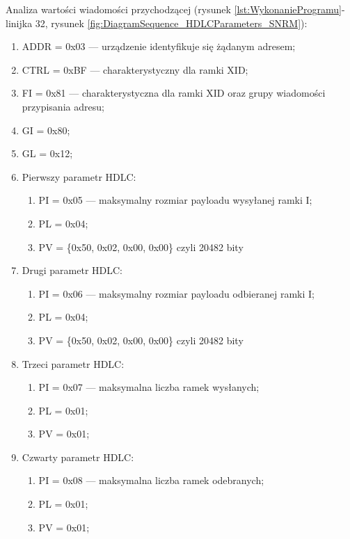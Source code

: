 Analiza wartości wiadomości przychodzącej 
(rysunek \ref{lst:WykonanieProgramu}- linijka 32, rysunek \ref{fig:DiagramSequence_HDLCParameters_SNRM}):
\begin{enumerate}
    \item ADDR = 0x03 --- urządzenie identyfikuje się żądanym adresem;
    \item CTRL = 0xBF --- charakterystyczny dla ramki XID;
    \item FI = 0x81 --- charakterystyczna dla ramki XID oraz grupy wiadomości przypisania adresu;
    \item GI = 0x80;
    \item GL = 0x12;
    \item Pierwszy parametr HDLC:
    \begin{enumerate}
        \item PI = 0x05 --- maksymalny rozmiar payloadu wysyłanej ramki I;
        \item PL = 0x04;
        \item PV = \{0x50, 0x02, 0x00, 0x00\} czyli 20482 bity
    \end{enumerate}
    \item Drugi parametr HDLC:
    \begin{enumerate}
        \item PI = 0x06 --- maksymalny rozmiar payloadu odbieranej ramki I;
        \item PL = 0x04;
        \item PV = \{0x50, 0x02, 0x00, 0x00\} czyli 20482 bity
    \end{enumerate}
    \item Trzeci parametr HDLC:
    \begin{enumerate}
        \item PI = 0x07 --- maksymalna liczba ramek wysłanych;
        \item PL = 0x01;
        \item PV = 0x01;
    \end{enumerate}
    \item Czwarty parametr HDLC:
    \begin{enumerate}
        \item PI = 0x08 --- maksymalna liczba ramek odebranych;
        \item PL = 0x01;
        \item PV = 0x01;
    \end{enumerate}
\end{enumerate}
